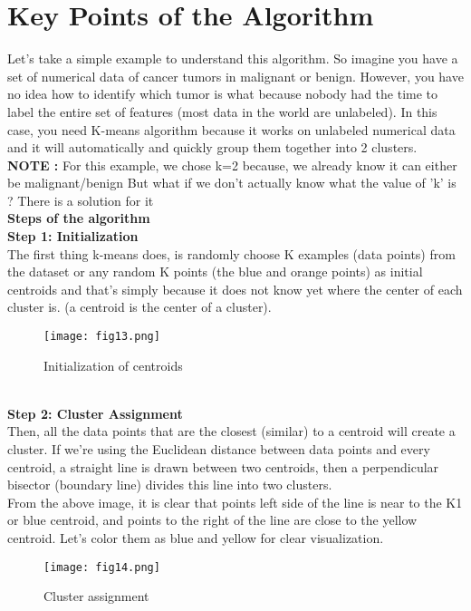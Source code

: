 \documentclass[a4paper, 11pt]{article}
\begin{document}
\section{Key Points of the Algorithm}
Let’s take a simple example to understand this algorithm. So imagine you have a set of numerical data of cancer tumors in 
malignant or benign. However, you have no idea how to identify which tumor is what because nobody had the time to label the entire set of features (most data in the world are unlabeled). 
In this case, you need K-means algorithm because it works on unlabeled numerical data and it will automatically and quickly group them together into 2 clusters.\\
\textbf{NOTE :} For this example, we chose k=2 because, we already know it can either be malignant/benign
 But what if we don't actually know what the value of 'k' is ? There is a solution for it \vspace{4mm}\\  
\textbf{Steps of the algorithm }\\
\textbf{Step 1: Initialization}\\
The first thing k-means does, is randomly choose K examples (data points) from the dataset or any random K points
(the blue and orange points) as initial centroids and that’s simply because it does not know yet where the center of each cluster is. (a centroid is the center of a cluster).
\begin{figure}[ht!]
    \texttt{[image: fig13.png]}
    \caption{Initialization of centroids}
    \label{fig:fig13}
  \end{figure}
\vspace{3mm}\\
\textbf{Step 2: Cluster Assignment}  \\
Then, all the data points that are the closest (similar) to a centroid will create a cluster. 
If we’re using the Euclidean distance between data points and every centroid, a straight line is drawn
 between two centroids, then a perpendicular bisector (boundary line) divides this line into two clusters.\\
 From the above image, it is clear that points left side of the line is near to the K1 or blue centroid, and points to the right of the line are close to the yellow centroid. 
 Let's color them as blue and yellow for clear visualization.
\pagebreak

\begin{figure}[h!]
    \texttt{[image: fig14.png]}
    \label{fig:fig14}
    \caption{Cluster assignment}
  \end{figure}
\end{document}
